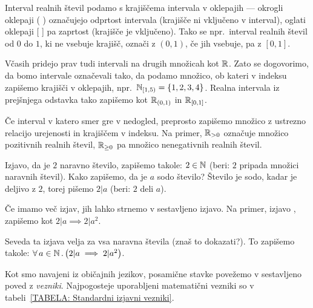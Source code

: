 		Interval realnih števil podamo s krajiščema intervala v oklepajih --- okrogli oklepaji ( ) označujejo odprtost intervala (krajišče ni vključeno v interval), oglati oklepaji [ ] pa zaprtost (krajišče je vključeno). Tako se npr.~interval realnih števil od $0$ do $1$, ki ne vsebuje krajišč, označi z $(0, 1)$, če jih vsebuje, pa z $[0, 1]$.
		
		Včasih pridejo prav tudi intervali na drugih množicah kot $\mathbb{R}$. Zato se dogovorimo, da bomo intervale označevali tako, da podamo množico, ob kateri v indeksu zapišemo krajišči v oklepajih, npr.~$\intco[\NN]{1}{5} = \set{1, 2, 3, 4}$. Realna intervala iz prejšnjega odstavka tako zapišemo kot ${\mathbb{R}}_{(0, 1)}$ in ${\mathbb{R}}_{[0, 1]}$.
		
		Če interval v katero smer gre v nedogled, preprosto zapišemo množico z ustrezno relacijo urejenosti in krajiščem v indeksu. Na primer, $\mathbb{R}_{> 0}$ označuje množico pozitivnih realnih števil, $\mathbb{R}_{\geq 0}$ pa množico nenegativnih realnih števil.
		
		
		Izjavo, da je $2$ naravno število, zapišemo takole: $2 \in \mathbb{N}$ (beri: $2$ pripada množici naravnih števil). Kako zapišemo, da je $a$ sodo število? Število je sodo, kadar je deljivo z $2$, torej pišemo $2 | a$ (beri: $2$ deli $a$).
		
		Če imamo več izjav, jih lahko strnemo v sestavljeno izjavo. Na primer, izjavo , zapišemo kot $2 | a \implies 2 | a^2$.
		
		Seveda ta izjava velja za vsa naravna števila (znaš to dokazati?). To zapišemo takole: $\all{a}[\NN]{2 | a \implies 2 | a^2}$.
		
		Kot smo navajeni iz običajnih jezikov, posamične stavke povežemo v sestavljeno poved z \emph{vezniki}. Najpogosteje uporabljeni matematični vezniki so v tabeli~\ref{TABELA: Standardni izjavni vezniki}.
		
